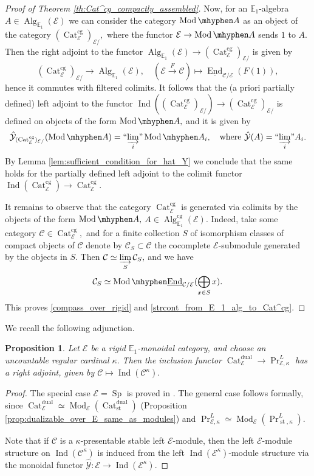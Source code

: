 \documentclass[11pt,leqno]{amsart}
\newtheorem{prop}[theo]{Proposition}
\numberwithin{equation}{section}
\def\End{\operatorname{End}}
\newcommand{\hy}{\mhyphen}
\newcommand{\indlim}[1][]{\mathop{\varinjlim}\limits_{#1}}
\newcommand{\inddlim}[1][]{{``{\indlim[#1]}"}}
\newcommand{\biggplus}[1][]{\mathop{\bigoplus}\limits_{#1}}
\newcommand{\xto}{\xrightarrow}
\newcommand{\Cat}{\operatorname{Cat}}
\newcommand{\st}{\operatorname{st}}
\newcommand{\cg}{\operatorname{cg}}
\newcommand{\dual}{\operatorname{dual}}
\newcommand{\bE}{{\mathbb E}}
\newcommand{\cC}{{\mathcal C}}
\newcommand{\cE}{{\mathcal E}}
\newcommand{\cY}{{\mathcal Y}}
\newcommand{\un}{\underline}
\newcommand{\Sp}{\operatorname{Sp}}
\newcommand{\Ind}{\operatorname{Ind}}
\newcommand{\Alg}{\operatorname{Alg}}
\newcommand{\Mod}{\operatorname{Mod}}
\begin{document}
\begin{proof}[Proof of Theorem \ref{th:Cat^cg_compactly_assembled}]
Now, for an $\bE_1$-algebra $A\in\Alg_{\bE_1}(\cE)$ we can consider the category $\Mod\hy A$ as an object of the category $(\Cat_{\cE}^{\cg})_{\cE/},$ where the functor $\cE\to\Mod\hy A$ sends $1$ to $A.$ Then the right adjoint to the functor $\Alg_{\bE_1}(\cE)\to (\Cat_{\cE}^{\cg})_{\cE/}$ is given by
\begin{equation*}
(\Cat_{\cE}^{\cg})_{\cE/}\to \Alg_{\bE_1}(\cE),\quad (\cE\xto{F}\cC)\mapsto \un{\End}_{\cC/\cE}(F(1)),
\end{equation*} 
hence it commutes with filtered colimits. It follows that the (a priori partially defined) left adjoint to the functor $\Ind((\Cat_{\cE}^{\cg})_{\cE/})\to (\Cat_{\cE}^{\cg})_{\cE/}$ is defined on objects of the form $\Mod\hy A,$ and it is given by
\begin{equation*}
\hat{\cY}_{(\Cat_{\cE}^{\cg})_{\cE/}}(\Mod\hy A)=\inddlim[i]\Mod\hy A_i,\quad\text{where }\hat{\cY}(A)=\inddlim[i]A_i.
\end{equation*}
By Lemma \ref{lem:sufficient_condition_for_hat_Y} we conclude that the same holds for the partially defined left adjoint to the colimit functor $\Ind(\Cat_{\cE}^{\cg})\to \Cat_{\cE}^{\cg}.$

It remains to observe that the category $\Cat_{\cE}^{\cg}$ is generated via colimits by the objects of the form $\Mod\hy A,$ $A\in\Alg_{\bE_1}^{\cg}(\cE).$ Indeed, take some category $\cC\in\Cat_{\cE}^{\cg},$ and for a finite collection $S$ of isomorphism classes of compact objects of $\cC$ denote by $\cC_S\subset\cC$ the cocomplete $\cE$-submodule generated by the objects in $S.$ Then $\cC\simeq\indlim[S]\cC_S,$ and we have
\begin{equation*}
\cC_S\simeq \Mod\hy \un{\End}_{\cC/\cE}(\biggplus[x\in S]x).
\end{equation*}
This proves \ref{compass_over_rigid} and \ref{strcont_from_E_1_alg_to_Cat^cg}.
\end{proof}

We recall the following adjunction.

\begin{prop}\label{prop:relative_nonstandard_adjunction} Let $\cE$ be a rigid $\bE_1$-monoidal category, and  choose an uncountable regular cardinal $\kappa.$ Then the inclusion functor $\Cat_{\cE}^{\dual}\to \Pr^L_{\cE,\kappa}$ has a right adjoint, given by $\cC\mapsto\Ind(\cC^{\kappa}).$\end{prop}

\begin{proof} The special case $\cE=\Sp$ is proved in \cite[Proposition 1.89]{E24}. The general case follows formally, since $\Cat_{\cE}^{\dual}\simeq \Mod_{\cE}(\Cat_{\st}^{\dual})$ (Proposition \ref{prop:dualizable_over_E_same_as_modules}) and $\Pr^L_{\cE,\kappa}\simeq \Mod_{\cE}(\Pr^L_{\st,\kappa}).$
	
Note that if $\cC$ is a $\kappa$-presentable stable left $\cE$-module, then the left $\cE$-module structure on $\Ind(\cC^{\kappa})$ is induced from the left $\Ind(\cE^{\kappa})$-module structure via the monoidal functor $\hat{\cY}:\cE\to\Ind(\cE^{\kappa}).$\end{proof}
\end{document}
